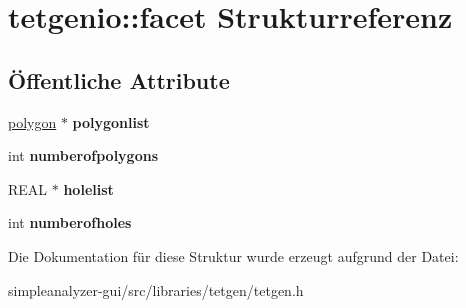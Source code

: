 \hypertarget{structtetgenio_1_1facet}{\section{tetgenio\-:\-:facet Strukturreferenz}
\label{structtetgenio_1_1facet}
}
\subsection*{Öffentliche Attribute}
\begin{DoxyCompactItemize}
\item 
\hypertarget{structtetgenio_1_1facet_ad73474fc4f07efdd714f0441948c5dfa}{\hyperlink{structtetgenio_1_1polygon}{polygon} $\ast$ {\bfseries polygonlist}}\label{structtetgenio_1_1facet_ad73474fc4f07efdd714f0441948c5dfa}

\item 
\hypertarget{structtetgenio_1_1facet_a845d93a1341532b2f0de8b1e75a5d0bb}{int {\bfseries numberofpolygons}}\label{structtetgenio_1_1facet_a845d93a1341532b2f0de8b1e75a5d0bb}

\item 
\hypertarget{structtetgenio_1_1facet_aecc34fbcd7087b45baecf2ba43d57757}{R\-E\-A\-L $\ast$ {\bfseries holelist}}\label{structtetgenio_1_1facet_aecc34fbcd7087b45baecf2ba43d57757}

\item 
\hypertarget{structtetgenio_1_1facet_acc9857df4007aa20199f8979353339c7}{int {\bfseries numberofholes}}\label{structtetgenio_1_1facet_acc9857df4007aa20199f8979353339c7}

\end{DoxyCompactItemize}


Die Dokumentation für diese Struktur wurde erzeugt aufgrund der Datei\-:\begin{DoxyCompactItemize}
\item 
simpleanalyzer-\/gui/src/libraries/tetgen/tetgen.\-h\end{DoxyCompactItemize}
